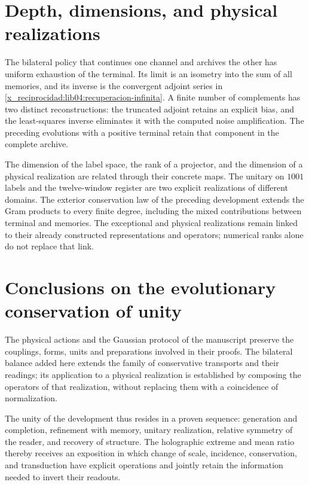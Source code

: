 \section{Depth, dimensions, and physical realizations}
\label{x_reciprocidad:lib06:profundidad}

The bilateral policy that continues one channel and archives the other
has uniform exhaustion of the terminal. Its limit is an
isometry into the sum of all memories, and its inverse is
the convergent adjoint series in
\eqref{x_reciprocidad:lib04:recuperacion-infinita}. A finite number of
complements has two distinct reconstructions: the
truncated adjoint retains an explicit bias, and the least-squares
inverse eliminates it with the computed noise
amplification. The preceding evolutions with a positive terminal
retain that component in the complete archive.

The dimension of the label space, the rank of a projector, and
the dimension of a physical realization are related through
their concrete maps. The unitary on \(1001\) labels and the
twelve-window register are two explicit realizations of
different domains. The exterior conservation law of the preceding
development extends the Gram products to every finite degree,
including the mixed contributions between terminal and memories.
The exceptional and physical realizations remain linked
to their already constructed representations and operators; numerical
ranks alone do not replace that link.

\section{Conclusions on the evolutionary conservation of unity}
The physical actions and the Gaussian protocol of the manuscript
preserve the couplings, forms, units and
preparations involved in their proofs. The bilateral
balance added here extends the family of conservative
transports and their readings; its application to a physical
realization is established by composing the operators of that
realization, without replacing them with a coincidence of
normalization.

The unity of the development thus resides in a proven
sequence: generation and completion, refinement with memory,
unitary realization, relative symmetry of the reader, and recovery
of structure. The holographic extreme and mean ratio thereby
receives an exposition in which change of scale, incidence,
conservation, and transduction have explicit operations and
jointly retain the information needed to invert
their readouts.
